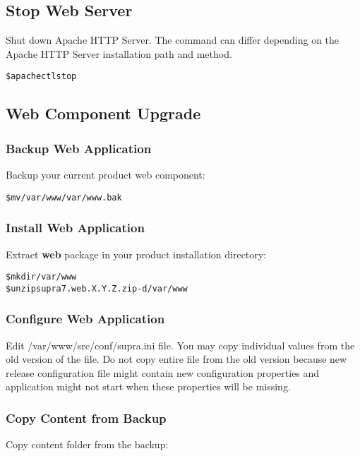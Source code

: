 \documentclass[12pt]{article}
\newcommand{\vigPackageName}{supra7}
\newcommand{\vigPathToProject}{/var/www}
\newcommand{\vigPathToSrc}{/src}
\begin{document}
\subsection{Stop Web Server}
Shut down Apache HTTP Server. The command can differ depending on the Apache HTTP Server installation path and method.

\begin{alltt}
\$ apachectl stop
\end{alltt}

\subsection{Web Component Upgrade}

\subsubsection{Backup Web Application}
Backup your current product web component:

\begin{alltt}
\$ mv \vigPathToProject \vigPathToProject.bak
\end{alltt}

\subsubsection{Install Web Application}
Extract \textbf{web} package in your product installation directory:

\begin{alltt}
\$ mkdir \vigPathToProject
\$ unzip {\vigPackageName}.web.X.Y.Z.zip -d \vigPathToProject
\end{alltt}

\subsubsection{Configure Web Application}
Edit \textsf{\vigPathToProject\vigPathToSrc/conf/supra.ini} file. You may copy individual values from the old version of the file. Do not copy entire file from the old version because new release configuration file might contain new configuration properties and application might not start when these properties will be missing.

\subsubsection{Copy Content from Backup}
Copy content folder from the backup:
\end{document}

